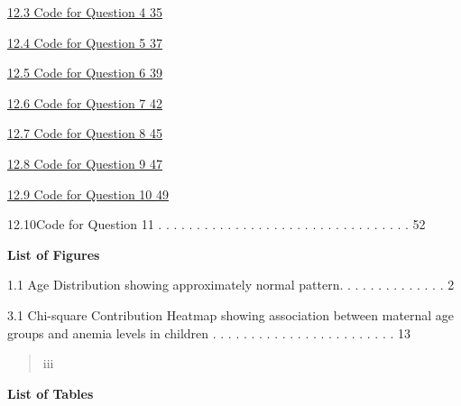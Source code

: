 \hyperref[code-for-question-4]{12.3 Code for Question 4
\hyperref[code-for-question-4]{35}}

\hyperref[code-for-question-5]{12.4 Code for Question 5
\hyperref[code-for-question-5]{37}}

\hyperref[code-for-question-6]{12.5 Code for Question 6
\hyperref[code-for-question-6]{39}}

\hyperref[code-for-question-7]{12.6 Code for Question 7
\hyperref[code-for-question-7]{42}}

\hyperref[code-for-question-8]{12.7 Code for Question 8
\hyperref[code-for-question-8]{45}}

\hyperref[code-for-question-9]{12.8 Code for Question 9
\hyperref[code-for-question-9]{47}}

\hyperref[code-for-question-10]{12.9 Code for Question 10
\hyperref[code-for-question-10]{49}}

12.10Code for Question 11 . . . . . . . . . . . . . . . . . . . . . . .
. . . . . . . . . . 52

\textbf{List of Figures}

1.1 Age Distribution showing approximately normal pattern. . . . . . . .
. . . . . . 2

3.1 Chi-square Contribution Heatmap showing association between maternal
age groups and anemia levels in children . . . . . . . . . . . . . . . .
. . . . . . . . 13

\begin{quote}
iii
\end{quote}

\textbf{List of Tables}

